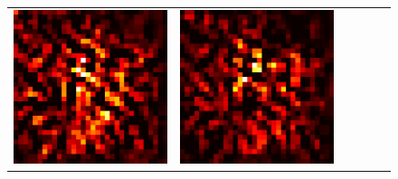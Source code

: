 \documentclass[preprint,12pt]{elsarticle}
\begin{document}
\begin{figure}[p]
\begin{tabular}{cccccc}
  \includegraphics[scale=\scale]{../visualizations/examples/cifar10/resnet18/positive_saliency_map/9.png} & 
  \includegraphics[scale=\scale]{../visualizations/examples/cifar10/resnet18/negative_saliency_map/9.png} & 

\end{tabular}
\end{figure}
\end{document}
